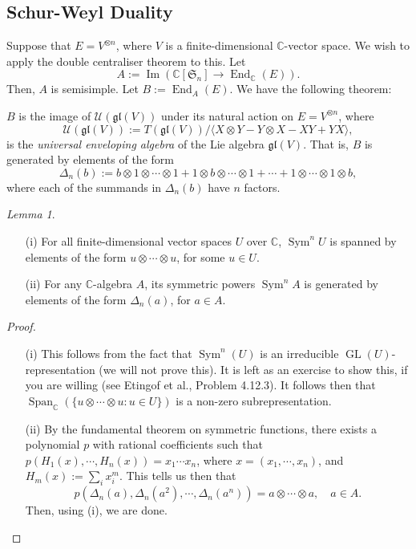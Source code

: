 \documentclass[a4paper]{report}
\theoremstyle{definition}
\theoremstyle{remark}
\theoremstyle{proposition}
\theoremstyle{conjecture}
\theoremstyle{lemma}
\newtheorem{lemma}{Lemma}
\theoremstyle{corollary}
\theoremstyle{exercise}
\theoremstyle{example}
\newcommand{\C}{\mathbb{C}}
\newcommand{\mcal}{\mathcal}
\newcommand{\on}{\operatorname}
\begin{document}
\subsection{Schur-Weyl Duality}

Suppose that $E = V^{\otimes n}$, where $V$ is a finite-dimensional 
$\C$-vector space. We wish to apply the double centraliser theorem
to this. Let 
$$A := \on{Im}\left(\C[\mathfrak{S}_n] \to \on{End}_\C(E)\right).$$
Then, $A$ is semisimple. Let $B := \on{End}_A(E)$. 
We have the following theorem:

\begin{theorem}
    $B$ is the image of $\mcal{U}(\mathfrak{gl}(V))$ under its natural action
    on $E = V^{\otimes n}$, where 
    $$\mcal{U}(\mathfrak{gl}(V)) := T(\mathfrak{gl}(V))/\langle X\otimes Y -Y\otimes X - XY + YX\rangle,$$
    is the \emph{universal enveloping algebra} of the Lie algebra
    $\mathfrak{gl}(V)$. 
    That is, $B$ is generated by elements of the form 
    $$\Delta_n(b) := b\otimes 1 \otimes \cdots \otimes 1 + 1\otimes b \otimes \cdots \otimes 1 + \cdots + 1\otimes \cdots \otimes 1\otimes b,$$
    where each of the summands in $\Delta_n(b)$ have $n$ factors.
\end{theorem}

\begin{lemma}\label{lem17}
    \leavevmode
    \begin{itemize}
        \item[(i)] For all finite-dimensional vector spaces $U$ over $\C$,
            $\on{Sym}^nU$ is spanned by elements of the form
            $u \otimes \cdots \otimes u$, for some $u\in U$.
        \item[(ii)] For any $\C$-algebra $A$, its symmetric powers $\on{Sym}^nA$
            is generated by elements of the form $\Delta_n(a)$, for $a\in A$.
    \end{itemize}
\end{lemma}

\begin{proof}
    \leavevmode
    \begin{itemize}
        \item[(i)] This follows from the fact that $\on{Sym}^n(U)$ is an 
            irreducible $\on{GL}(U)$-representation (we will not prove this).
            It is left as an exercise to show this, if you are willing 
            (see Etingof et al., Problem 4.12.3). It follows then that 
            $\on{Span}_\C(\lbrace u\otimes \cdots \otimes u : u \in U \rbrace)$
            is a non-zero subrepresentation.
        \item[(ii)] By the fundamental theorem on symmetric functions, there 
            exists a polynomial $p$ with rational coefficients such that 
            $p(H_1(x),\cdots,H_n(x)) = x_1\cdots x_n$, where 
            $x = (x_1,\cdots,x_n)$, and $H_m(x) := \sum_i x_i^m$. This tells us
            then that 
            $$p(\Delta_n(a), \Delta_n(a^2), \cdots, \Delta_n(a^n)) = a\otimes \cdots \otimes a,\quad a\in A.$$
            Then, using (i), we are done.
    \end{itemize}
\end{proof}
\end{document}
